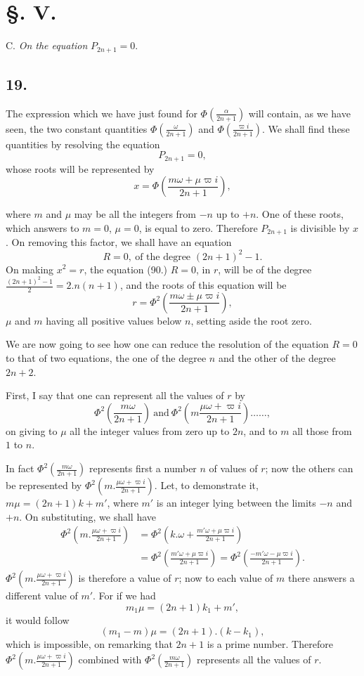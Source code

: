 \documentclass{article}
\begin{document}
\section*{§. V.}

C. \emph{On the equation} $P_{2n+1}=0$.

\subsection*{19.}

The expression which we have just found for $\Phi\left(\frac{\alpha}{2n+1}\right)$ will contain, as we have seen, the two constant quantities $\Phi\left(\frac{\omega}{2n+1}\right)$ and $\Phi\left(\frac{\varpi i}{2n+1}\right)$. We shall find these quantities by resolving the equation
\[ P_{2n+1}=0, \]
whose roots will be represented by
\[ x=\Phi\left(\frac{m\omega+\mu\varpi i}{2n+1}\right), \]

where $m$ and $\mu$ may be all the integers from $-n$ up to $+n$. One of these roots, which answers to $m=0$, $\mu=0$, is equal to zero. Therefore $P_{2n+1}$ is divisible by $x$. On removing this factor, we shall have an equation
\[ R=0,\ \text{of the degree }(2n+1)^{2}-1. \]
On making $x^{2}=r$, the equation (90.) $R=0$, in $r$, will be of the degree $\frac{(2n+1)^{2}-1}{2}=2.n(n+1)$, and the roots of this equation will be
\[ r=\Phi^{2}\left(\frac{m\omega\pm\mu\varpi i}{2n+1}\right), \tag{91.} \]
$\mu$ and $m$ having all positive values below $n$, setting aside the root zero.

We are now going to see how one can reduce the resolution of the equation $R=0$ to that of two equations, the one of the degree $n$ and the other of the degree $2n+2$.

First, I say that one can represent all the values of $r$ by
\[ \Phi^{2}\left(\frac{m\omega}{2n+1}\right)\ \text{and}\ \Phi^{2}\left(m\frac{\mu\omega+\varpi i}{2n+1}\right)\ldots\ldots, \tag{92.} \]
on giving to $\mu$ all the integer values from zero up to $2n$, and to $m$ all those from $1$ to $n$.

In fact $\Phi^{2}\left(\frac{m\omega}{2n+1}\right)$ represents first a number $n$ of values of $r$; now the others can be represented by $\Phi^{2}\left(m.\frac{\mu\omega+\varpi i}{2n+1}\right)$. Let, to demonstrate it, $m\mu=(2n+1)k+m'$, where $m'$ is an integer lying between the limits $-n$ and $+n$. On substituting, we shall have
\[ \begin{aligned}
\Phi^{2}\left(m.\frac{\mu\omega+\varpi i}{2n+1}\right)&=\Phi^{2}\left(k.\omega+\frac{m'\omega+\mu\varpi i}{2n+1}\right)\\
&=\Phi^{2}\left(\frac{m'\omega+\mu\varpi i}{2n+1}\right)=\Phi^{2}\left(\frac{-m'\omega-\mu\varpi i}{2n+1}\right).
\end{aligned} \]
$\Phi^{2}\left(m.\frac{\mu\omega+\varpi i}{2n+1}\right)$ is therefore a value of $r$; now to each value of $m$ there answers a different value of $m'$. For if we had
\[ m_{1}\mu=(2n+1)k_{1}+m', \]
it would follow
\[ (m_{1}-m)\mu=(2n+1).(k-k_{1}), \]
which is impossible, on remarking that $2n+1$ is a prime number. Therefore $\Phi^{2}\left(m.\frac{\mu\omega+\varpi i}{2n+1}\right)$ combined with $\Phi^{2}\left(\frac{m\omega}{2n+1}\right)$ represents all the values of $r$.
\end{document}
